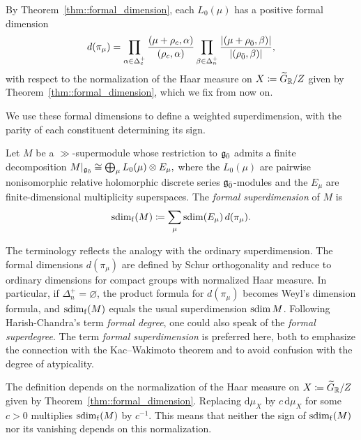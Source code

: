 By Theorem~\ref{thm::formal_dimension}, each $L_0(\mu)$ has a positive formal dimension
\begin{equation}
d(\pi_\mu)
=
\prod_{\alpha\in\Delta_c^+}
\frac{(\mu+\rho_c,\alpha)}
     {(\rho_c,\alpha)}
\prod_{\beta\in\Delta_n^+}
\frac{\left|{(\mu+\rho_{\bar0},\beta)}\right|}
     {\left|{(\rho_{\bar0},\beta)}\right|},
\end{equation}
with respect to the normalization of the Haar measure on $X\coloneqq \widetilde{G}_{{\mathbb R}}/Z$ given by Theorem~\ref{thm::formal_dimension}, which we fix from now on.


We use these formal dimensions to define a weighted superdimension, with the parity of each constituent determining its sign.

\begin{definition}
Let $M$ be a $\gg$-supermodule whose restriction to ${\mathfrak{g}_{\bar{0}}}$ admits a finite decomposition
$
M|_{{\mathfrak{g}_{\bar{0}}}}\cong\bigoplus_\mu L_0(\mu)\otimes E_\mu,
$
where the $L_0(\mu)$ are pairwise nonisomorphic relative holomorphic discrete series ${\mathfrak{g}_{\bar{0}}}$-modules and the $E_\mu$ are finite-dimensional multiplicity superspaces. The \emph{formal superdimension} of $M$ is
\begin{equation*}
\operatorname{sdim}_{\mathrm f}(M)\coloneqq\sum_\mu\operatorname{sdim}(E_\mu)\,d(\pi_\mu).
\end{equation*}
\end{definition}


\begin{remark}
The terminology reflects the analogy with the ordinary superdimension. The
formal dimensions $d(\pi_\mu)$ are defined by Schur orthogonality and reduce
to ordinary dimensions for compact groups with normalized Haar measure. In
particular, if $\Delta_n^+=\varnothing$, the product formula for $d(\pi_\mu)$
becomes Weyl's dimension formula, and $\operatorname{sdim}_{\mathrm f}(M)$ equals the usual
superdimension $\operatorname{sdim} M$. Following Harish-Chandra's term \emph{formal degree}, one
could also speak of the \emph{formal superdegree}. The term \emph{formal superdimension} is preferred here, both to emphasize the connection with the Kac--Wakimoto theorem and to avoid confusion with the degree of atypicality.
\end{remark}


\begin{remark}\label{rmk::Haar_normalization_sdim} The definition depends on the normalization of the Haar measure on $X\coloneqq \widetilde{G}_{{\mathbb R}}/Z$ given by Theorem~\ref{thm::formal_dimension}. Replacing $\mathrm{d}\mu_{X}$ by $c\,\mathrm{d}\mu_{X}$ for some $c>0$ multiplies $\operatorname{sdim}_{\mathrm f}(M)$ by $c^{-1}$. This means that neither the sign of $\operatorname{sdim}_{\mathrm f}(M)$ nor its vanishing depends on this normalization. 
\end{remark}


